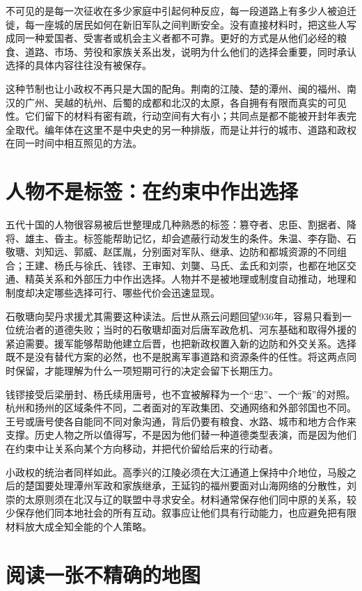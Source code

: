 不可见的是每一次征收在多少家庭中引起何种反应，每一段道路上有多少人被迫迁徙，每一座城的居民如何在新旧军队之间判断安全。没有直接材料时，把这些人写成同一种爱国者、受害者或机会主义者都不可靠。更好的方式是从他们必经的粮食、道路、市场、劳役和家族关系出发，说明为什么他们的选择会重要，同时承认选择的具体内容往往没有被保存。

这种节制也让小政权不再只是大国的配角。荆南的江陵、楚的潭州、闽的福州、南汉的广州、吴越的杭州、后蜀的成都和北汉的太原，各自拥有有限而真实的可见性。它们留下的材料有密有疏，行动空间有大有小；共同点是都不能被开封年表完全取代。编年体在这里不是中央史的另一种排版，而是让并行的城市、道路和政权在同一时间中相互照见的方法。

\section{人物不是标签：在约束中作出选择}

五代十国的人物很容易被后世整理成几种熟悉的标签：篡夺者、忠臣、割据者、降将、雄主、昏主。标签能帮助记忆，却会遮蔽行动发生的条件。朱温、李存勖、石敬瑭、刘知远、郭威、赵匡胤，分别面对军队、继承、边防和都城资源的不同组合；王建、杨氏与徐氏、钱镠、王审知、刘龑、马氏、孟氏和刘崇，也都在地区交通、精英关系和外部压力中作出选择。人物并不是被地理或制度自动推动，地理和制度却决定哪些选择可行、哪些代价会迅速显现。

石敬瑭向契丹求援尤其需要这种读法。后世从燕云问题回望936年，容易只看到一位统治者的道德失败；当时的石敬瑭却面对后唐军政危机、河东基础和取得外援的紧迫需要。援军能够帮助他建立后晋，也把新政权置入新的边防和外交关系。选择既不是没有替代方案的必然，也不是脱离军事道路和资源条件的任性。将这两点同时保留，才能理解为什么一项短期可行的决定会留下长期压力。

钱镠接受后梁册封、杨氏续用唐号，也不宜被解释为一个“忠”、一个“叛”的对照。杭州和扬州的区域条件不同，二者面对的军政集团、交通网络和外部邻国也不同。王号或唐号使各自能同不同对象沟通，背后仍要有粮食、水路、城市和地方合作来支撑。历史人物之所以值得写，不是因为他们替一种道德类型表演，而是因为他们在约束中让关系向某个方向移动，并把代价留给后来的行动者。

小政权的统治者同样如此。高季兴的江陵必须在大江通道上保持中介地位，马殷之后的楚国要处理潭州军政和家族继承，王延钧的福州要面对山海网络的分散性，刘崇的太原则须在北汉与辽的联盟中寻求安全。材料通常保存他们同中原的关系，较少保存他们同本地社会的所有互动。叙事应让他们具有行动能力，也应避免把有限材料放大成全知全能的个人策略。

\section{阅读一张不精确的地图}

